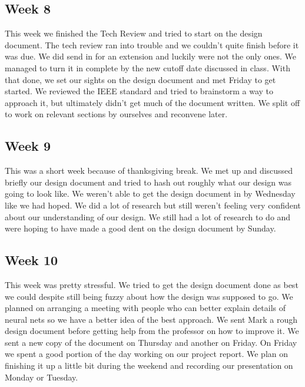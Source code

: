 \documentclass[onecolumn, draftclsnofoot,10pt, compsoc]{IEEEtran}
\begin{document}
\subsection{Week 8}
This week we finished the Tech Review and tried to start on the design document.
The tech review ran into trouble and we couldn't quite finish before it was due.
We did send in for an extension and luckily were not the only ones.
We managed to turn it in complete by the new cutoff date discussed in class.
With that done, we set our sights on the design document and met Friday to get started.
We reviewed the IEEE standard and tried to brainstorm a way to approach it, but ultimately didn't get much of the document written.
We split off to work on relevant sections by ourselves and reconvene later.

\subsection{Week 9}
This was a short week because of thanksgiving break.
We met up and discussed briefly our design document and tried to hash out roughly what our design was going to look like.
We weren't able to get the design document in by Wednesday like we had hoped.
We did a lot of research but still weren't feeling very confident about our understanding of our design.
We still had a lot of research to do and were hoping to have made a good dent on the design document by Sunday.

\subsection{Week 10}
This week was pretty stressful.
We tried to get the design document done as best we could despite still being fuzzy about how the design was supposed to go.
We planned on arranging a meeting with people who can better explain details of neural nets so we have a better idea of the best approach.
We sent Mark a rough design document before getting help from the professor on how to improve it.
We sent a new copy of the document on Thursday and another on Friday.
On Friday we spent a good portion of the day working on our project report.
We plan on finishing it up a little bit during the weekend and recording our presentation on Monday or Tuesday.
\end{document}
